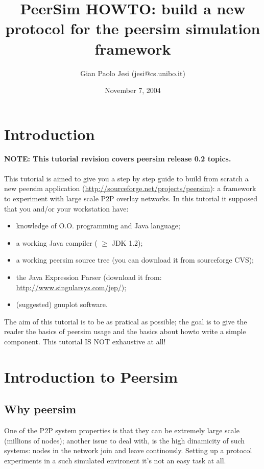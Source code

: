 \documentclass[a4paper,11pt]{article}
\title{PeerSim HOWTO: build a new protocol for the peersim simulation
framework}
\author{Gian Paolo Jesi (jesi@cs.unibo.it)}
\date{November 7, 2004}
\begin{document}
\maketitle



\section{Introduction}

\textbf{NOTE: This tutorial revision covers peersim release 0.2 topics.}\\
\\
This tutorial is aimed to give you a step by step guide to build from
scratch a new peersim application (\url{http://sourceforge.net/projects/peersim}):
a framework to experiment with large scale P2P overlay networks. In
this tutorial it supposed that you and/or your workstation have: 

\begin{itemize}
\item knowledge of O.O. programming and Java language;
\item a working Java compiler ( $\geq$ JDK 1.2);
\item a working peersim source tree (you can download it from sourceforge
CVS);
\item the Java Expression Parser (download it from: \url{http://www.singularsys.com/jep/});
\item (suggested) gnuplot software. 
\end{itemize}

The aim of this tutorial is to be
as pratical as possible; the goal is to give the reader the basics
of peersim usage and the basics about howto write a simple component.
This tutorial IS NOT exhaustive at all! 


\section{Introduction to Peersim}


\subsection{Why peersim}

One of the P2P system properties is that they can be extremely large
scale (millions of nodes); another issue to deal with, is the high
dinamicity of such systems: nodes in the network join and leave continously.
Setting up a protocol experiments in a such simulated environent it's
not an easy task at all.
\end{document}
